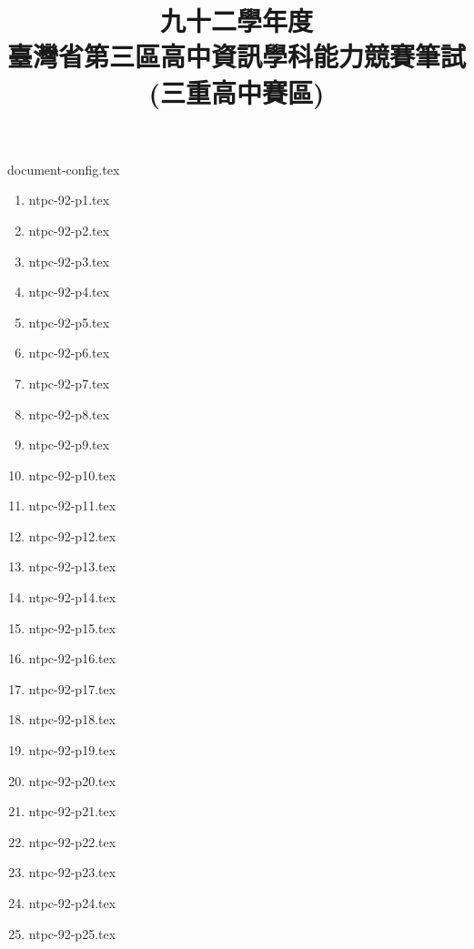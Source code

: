 \documentclass[12pt,a4paper]{report}
\begin{document}
\begin{CJK}{UTF8}{bkai}

{document-config.tex}
\title{九十二學年度\\臺灣省第三區高中資訊學科能力競賽筆試\\(三重高中賽區)}
\date{}
\maketitle

\begin{enumerate}
\item {ntpc-92-p1.tex}
\item {ntpc-92-p2.tex}
\item {ntpc-92-p3.tex}
\item {ntpc-92-p4.tex}
\item {ntpc-92-p5.tex}
\item {ntpc-92-p6.tex}
\item {ntpc-92-p7.tex}
\item {ntpc-92-p8.tex}
\item {ntpc-92-p9.tex}
\item {ntpc-92-p10.tex}
\item {ntpc-92-p11.tex}
\item {ntpc-92-p12.tex}
\item {ntpc-92-p13.tex}
\item {ntpc-92-p14.tex}
\item {ntpc-92-p15.tex}
\item {ntpc-92-p16.tex}
\item {ntpc-92-p17.tex}
\item {ntpc-92-p18.tex}
\item {ntpc-92-p19.tex}
\item {ntpc-92-p20.tex}
\item {ntpc-92-p21.tex}
\item {ntpc-92-p22.tex}
\item {ntpc-92-p23.tex}
\item {ntpc-92-p24.tex}
\item {ntpc-92-p25.tex}

\end{enumerate}
\end{CJK}
\end{document}
